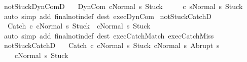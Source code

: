 \begin{isabellebody}
\ notStuck{\isacharunderscore}DynComD{\isacharcolon}\ \isanewline
\ \ {\isachardoublequoteopen}{\isasymlbrakk}{\isasymGamma}{\isasymturnstile}{\isasymlangle}DynCom\ c{\isacharcomma}Normal\ s{\isasymrangle}\ {\isasymRightarrow}{\isasymnotin}{\isacharbraceleft}Stuck{\isacharbraceright}{\isasymrbrakk}\ \isanewline
\ \ \ {\isasymLongrightarrow}\ {\isasymGamma}{\isasymturnstile}{\isasymlangle}{\isacharparenleft}c\ s{\isacharparenright}{\isacharcomma}Normal\ s{\isasymrangle}\ {\isasymRightarrow}{\isasymnotin}{\isacharbraceleft}Stuck{\isacharbraceright}{\isachardoublequoteclose}\isanewline
%
\isadelimproof
\ \ %
\endisadelimproof
%
\isatagproof
{}\isamarkupfalse%
\ {\isacharparenleft}auto\ simp\ add{\isacharcolon}\ final{\isacharunderscore}notin{\isacharunderscore}def\ dest{\isacharcolon}\ exec{\isachardot}DynCom{\isacharparenright}%
\endisatagproof
{\isafoldproof}%
%
\isadelimproof
\isanewline
%
\endisadelimproof
\isanewline
{}\isamarkupfalse%
\ notStuck{\isacharunderscore}CatchD{}{\isacharcolon}\ \isanewline
\ \ {\isachardoublequoteopen}{\isasymlbrakk}{\isasymGamma}{\isasymturnstile}{\isasymlangle}Catch\ c{}\ c{}{\isacharcomma}Normal\ s{\isasymrangle}\ {\isasymRightarrow}{\isasymnotin}{\isacharbraceleft}Stuck{\isacharbraceright}{\isasymrbrakk}\ {\isasymLongrightarrow}\ {\isasymGamma}{\isasymturnstile}{\isasymlangle}c{}{\isacharcomma}Normal\ s{\isasymrangle}\ {\isasymRightarrow}{\isasymnotin}{\isacharbraceleft}Stuck{\isacharbraceright}{\isachardoublequoteclose}\isanewline
%
\isadelimproof
\ \ %
\endisadelimproof
%
\isatagproof
{}\isamarkupfalse%
\ {\isacharparenleft}auto\ simp\ add{\isacharcolon}\ final{\isacharunderscore}notin{\isacharunderscore}def\ dest{\isacharcolon}\ exec{\isachardot}CatchMatch\ exec{\isachardot}CatchMiss\ {\isacharparenright}%
\endisatagproof
{\isafoldproof}%
%
\isadelimproof
\isanewline
%
\endisadelimproof
\isanewline
{}\isamarkupfalse%
\ notStuck{\isacharunderscore}CatchD{}{\isacharcolon}\ \isanewline
\ \ {\isachardoublequoteopen}{\isasymlbrakk}{\isasymGamma}{\isasymturnstile}{\isasymlangle}Catch\ c{}\ c{}{\isacharcomma}Normal\ s{\isasymrangle}\ {\isasymRightarrow}{\isasymnotin}{\isacharbraceleft}Stuck{\isacharbraceright}{\isacharsemicolon}\ {\isasymGamma}{\isasymturnstile}{\isasymlangle}c{}{\isacharcomma}Normal\ s{\isasymrangle}\ {\isasymRightarrow}Abrupt\ s{\isacharprime}{\isasymrbrakk}\ \isanewline
\ \ \ {\isasymLongrightarrow}\ {\isasymGamma}{\isasymturnstile}{\isasymlangle}c{}{\isacharcomma}Normal\ s{\isacharprime}{\isasymrangle}\ {\isasymRightarrow}{\isasymnotin}{\isacharbraceleft}Stuck{\isacharbraceright}{\isachardoublequoteclose}\isanewline

\end{isabellebody}
